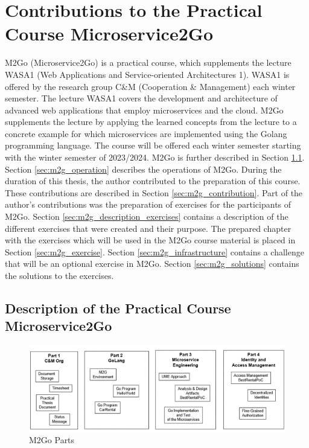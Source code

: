 \chapter{Contributions to the Practical Course Microservice2Go}
\label{cha:m2go}

M2Go (Microservice2Go) is a practical course, which supplements the lecture
WASA1 (Web Applications and Service-oriented Architectures 1). WASA1 is offered
by the research group C\&M (Cooperation \& Management) each winter semester.
The lecture WASA1 covers the development and architecture of advanced web
applications that employ microservices and the cloud. M2Go supplements the
lecture by applying the learned concepts from the lecture to a concrete example
for which microservices are implemented using the Golang programming language.
The course will be offered each winter semester starting with the winter
semester of 2023/2024. M2Go is further described in Section
\ref{sec:m2g_description}. Section \ref{sec:m2g_operation} describes the
operations of M2Go. During the duration of this thesis, the author contributed
to the preparation of this course. These contributions are described in Section
\ref{sec:m2g_contribution}. Part of the author's contributions was the
preparation of exercises for the participants of M2Go. 
Section \ref{sec:m2g_description_exercises} contains a description of the different exercises that were created
and their purpose. The prepared chapter with the exercises which will be used in the M2Go course material is placed in
Section \ref{sec:m2g_exercise}. Section \ref{sec:m2g_infrastructure} contains
a challenge that will be an optional exercise in M2Go.
Section \ref{sec:m2g_solutions} contains the solutions to the exercises.

\section{Description of the Practical Course Microservice2Go}
\label{sec:m2g_description}

\begin{figure}[tb]
	\centering
	\includegraphics[width=\textwidth]{figures/m2go_parts.png}
	\caption{M2Go Parts \cite{CM-W-M2G}}
	\label{fig:m2go_parts}
\end{figure}

